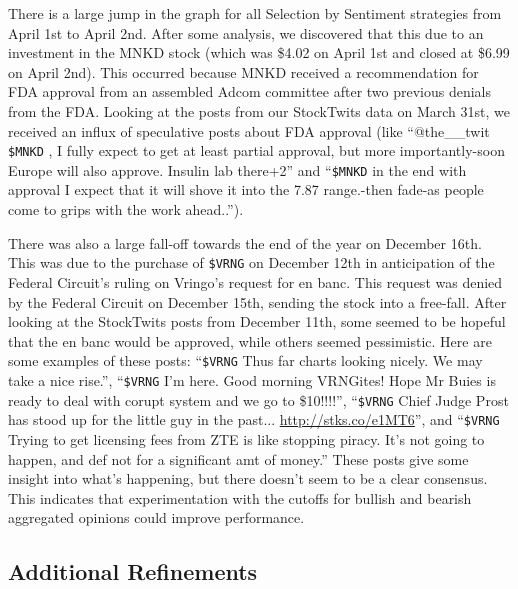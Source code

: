 There is a large jump in the graph for all Selection by Sentiment strategies from April 1st to April 2nd. After some analysis, we discovered that this due to an investment in the MNKD stock (which was \$4.02 on April 1st and closed at \$6.99 on April 2nd). This occurred because MNKD received a recommendation for FDA approval from an assembled Adcom committee after two previous denials from the FDA. Looking at the posts from our StockTwits data on March 31st, we received an influx of speculative posts about FDA approval (like ``@the\_\_twit \texttt{\$MNKD} , I fully expect to get at least partial approval, but more importantly-soon Europe will also approve. Insulin lab there+2'' and ``\texttt{\$MNKD} in the end with approval I expect that it will shove it into the 7.87 range.-then fade-as people come to grips with the work ahead..'').

There was also a large fall-off towards the end of the year on December 16th. This was due to the purchase of \texttt{\$VRNG} on December 12th in anticipation of the Federal Circuit’s ruling on Vringo’s request for en banc. This request was denied by the Federal Circuit on December 15th, sending the stock into a free-fall. After looking at the StockTwits posts from December 11th, some seemed to be hopeful that the en banc would be approved, while others seemed pessimistic. Here are some examples of these posts: ``\texttt{\$VRNG} Thus far charts looking nicely. We may take a nice rise.'', ``\texttt{\$VRNG} I’m here. Good morning VRNGites! Hope Mr Buies is ready to deal with corupt system and we go to \$10!!!!'', ``\texttt{\$VRNG} Chief Judge Prost has stood up for the little guy in the past...  \url{http://stks.co/e1MT6}'', and ``\texttt{\$VRNG} Trying to get licensing fees from ZTE is like stopping piracy. It’s not going to happen, and def not for a significant amt of money.'' These posts give some insight into what’s happening, but there doesn’t seem to be a clear consensus. This indicates that experimentation with the cutoffs for bullish and bearish aggregated opinions could improve performance.

\subsection{Additional Refinements}

